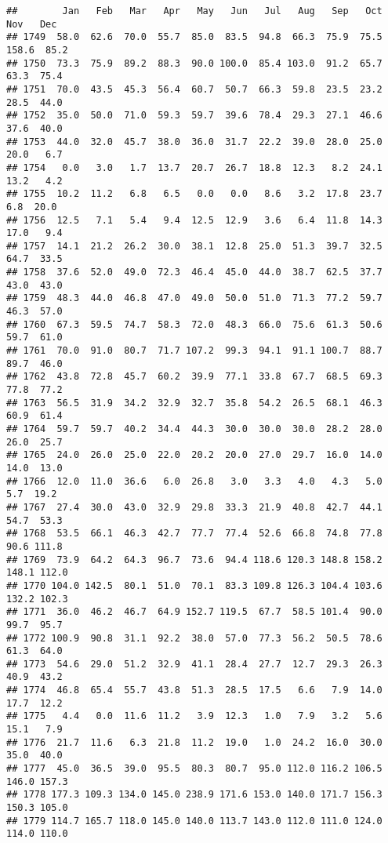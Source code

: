 \documentclass[
]{article}
\begin{document}
\begin{verbatim}
##        Jan   Feb   Mar   Apr   May   Jun   Jul   Aug   Sep   Oct   Nov   Dec
## 1749  58.0  62.6  70.0  55.7  85.0  83.5  94.8  66.3  75.9  75.5 158.6  85.2
## 1750  73.3  75.9  89.2  88.3  90.0 100.0  85.4 103.0  91.2  65.7  63.3  75.4
## 1751  70.0  43.5  45.3  56.4  60.7  50.7  66.3  59.8  23.5  23.2  28.5  44.0
## 1752  35.0  50.0  71.0  59.3  59.7  39.6  78.4  29.3  27.1  46.6  37.6  40.0
## 1753  44.0  32.0  45.7  38.0  36.0  31.7  22.2  39.0  28.0  25.0  20.0   6.7
## 1754   0.0   3.0   1.7  13.7  20.7  26.7  18.8  12.3   8.2  24.1  13.2   4.2
## 1755  10.2  11.2   6.8   6.5   0.0   0.0   8.6   3.2  17.8  23.7   6.8  20.0
## 1756  12.5   7.1   5.4   9.4  12.5  12.9   3.6   6.4  11.8  14.3  17.0   9.4
## 1757  14.1  21.2  26.2  30.0  38.1  12.8  25.0  51.3  39.7  32.5  64.7  33.5
## 1758  37.6  52.0  49.0  72.3  46.4  45.0  44.0  38.7  62.5  37.7  43.0  43.0
## 1759  48.3  44.0  46.8  47.0  49.0  50.0  51.0  71.3  77.2  59.7  46.3  57.0
## 1760  67.3  59.5  74.7  58.3  72.0  48.3  66.0  75.6  61.3  50.6  59.7  61.0
## 1761  70.0  91.0  80.7  71.7 107.2  99.3  94.1  91.1 100.7  88.7  89.7  46.0
## 1762  43.8  72.8  45.7  60.2  39.9  77.1  33.8  67.7  68.5  69.3  77.8  77.2
## 1763  56.5  31.9  34.2  32.9  32.7  35.8  54.2  26.5  68.1  46.3  60.9  61.4
## 1764  59.7  59.7  40.2  34.4  44.3  30.0  30.0  30.0  28.2  28.0  26.0  25.7
## 1765  24.0  26.0  25.0  22.0  20.2  20.0  27.0  29.7  16.0  14.0  14.0  13.0
## 1766  12.0  11.0  36.6   6.0  26.8   3.0   3.3   4.0   4.3   5.0   5.7  19.2
## 1767  27.4  30.0  43.0  32.9  29.8  33.3  21.9  40.8  42.7  44.1  54.7  53.3
## 1768  53.5  66.1  46.3  42.7  77.7  77.4  52.6  66.8  74.8  77.8  90.6 111.8
## 1769  73.9  64.2  64.3  96.7  73.6  94.4 118.6 120.3 148.8 158.2 148.1 112.0
## 1770 104.0 142.5  80.1  51.0  70.1  83.3 109.8 126.3 104.4 103.6 132.2 102.3
## 1771  36.0  46.2  46.7  64.9 152.7 119.5  67.7  58.5 101.4  90.0  99.7  95.7
## 1772 100.9  90.8  31.1  92.2  38.0  57.0  77.3  56.2  50.5  78.6  61.3  64.0
## 1773  54.6  29.0  51.2  32.9  41.1  28.4  27.7  12.7  29.3  26.3  40.9  43.2
## 1774  46.8  65.4  55.7  43.8  51.3  28.5  17.5   6.6   7.9  14.0  17.7  12.2
## 1775   4.4   0.0  11.6  11.2   3.9  12.3   1.0   7.9   3.2   5.6  15.1   7.9
## 1776  21.7  11.6   6.3  21.8  11.2  19.0   1.0  24.2  16.0  30.0  35.0  40.0
## 1777  45.0  36.5  39.0  95.5  80.3  80.7  95.0 112.0 116.2 106.5 146.0 157.3
## 1778 177.3 109.3 134.0 145.0 238.9 171.6 153.0 140.0 171.7 156.3 150.3 105.0
## 1779 114.7 165.7 118.0 145.0 140.0 113.7 143.0 112.0 111.0 124.0 114.0 110.0

\end{verbatim}
\end{document}

